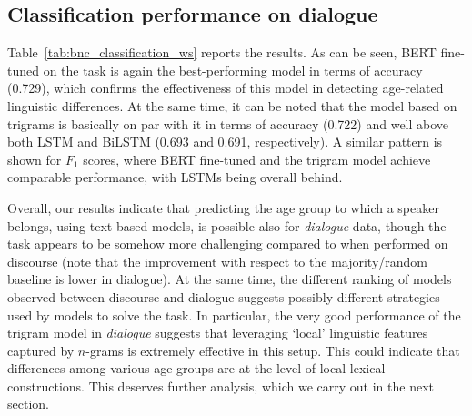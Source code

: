 \subsection{Classification performance on dialogue}
Table~\ref{tab:bnc_classification_ws} reports the results. As can be seen, BERT fine-tuned on the task is again the best-performing model in terms of accuracy (0.729), which confirms the effectiveness of this model in detecting age-related linguistic differences. At the same time, it can be noted that the model based on trigrams is basically on par with it in terms of accuracy (0.722) and well above both LSTM and BiLSTM (0.693 and 0.691, respectively). A similar pattern is shown for $F_1$ scores, where BERT fine-tuned and the trigram model achieve comparable performance, with LSTMs being overall behind. 

Overall, our results indicate that predicting the age group to which a speaker belongs, using text-based models, is possible also for \emph{dialogue} data, though the task appears to be somehow more challenging compared to when performed on discourse 
(note that the improvement with respect to the majority/random baseline is lower in dialogue). 
At the same time, the different ranking of models observed between discourse and dialogue suggests possibly different strategies used by models to solve the task. In particular, the very good performance of the trigram model in \emph{dialogue} suggests that leveraging `local' linguistic features captured by $n$-grams is extremely effective in this setup. This could indicate that differences among various age groups are at the level of
local lexical constructions.
This deserves further analysis, which we carry out in the next section.



